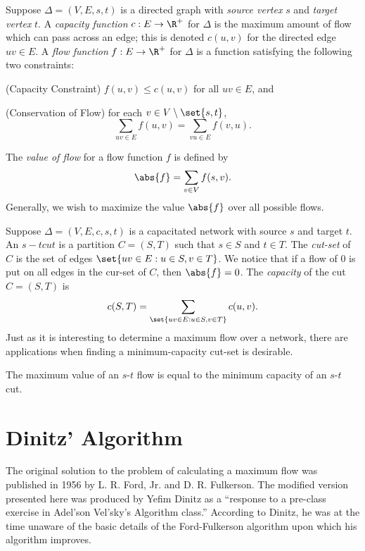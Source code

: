 \documentclass[m3380-lec-main.tex]{subfiles}
\begin{document}
\begin{defn} Suppose $\Delta = (V,E,s,t)$ is a directed graph with \emph{source vertex} $s$ and \emph{target vertex} $t$. A \emph{capacity function} $c:E\to\R^+$ for $\Delta$ is the maximum amount of flow which can pass across an edge; this is denoted $c(u,v)$ for the directed edge $uv\in E$. A \emph{flow function} $f:E\to \R^+$ for $\Delta$ is a function satisfying the following two constraints:
\begin{enum}
\item (Capacity Constraint) $f(u,v) \leq c(u,v)$ for all $uv\in E$, and
\item (Conservation of Flow) for each $v\in V\setminus\set{s,t}$, \[\sum_{uv\in E}f(u,v) = \sum_{vu\in E}f(v,u).\]
\end{enum}
The \emph{value of flow} for a flow function $f$ is defined by 
\[ \abs{f} = \sum_{v\in V}f(s,v) .\]
Generally, we wish to maximize the value $\abs{f}$ over all possible flows.
\end{defn}

\begin{defn} Suppose $\Delta = (V,E,c,s,t)$ is a capacitated network with source $s$ and target $t$. An $s-t cut$ is a partition $C=(S,T)$ such that $s\in S$ and $t\in T$. The \emph{cut-set} of $C$ is the set of edges $\set{uv\in E:u\in S, v\in T}$. We notice that if a flow of $0$ is put on all edges in the cur-set of $C$, then $\abs{f}=0$. The \emph{capacity} of the cut $C=(S,T)$ is 
\[c(S,T) = \sum_{\set{uv\in E: u\in S, v\in T}}c(u,v). \]
Just as it is interesting to determine a maximum flow over a network, there are applications when finding a minimum-capacity cut-set is desirable.
\end{defn}

\begin{thm} The maximum value of an $s$-$t$ flow is equal to the minimum capacity of an $s$-$t$ cut.
\end{thm}

\section{Dinitz' Algorithm}
The original solution to the problem of calculating a maximum flow was published in 1956 by {L. R. Ford, Jr. and D. R. Fulkerson}. The modified version presented here was produced by Yefim Dinitz as a ``response to a pre-class exercise in Adel'son Vel'sky's Algorithm class.'' According to Dinitz, he was at the time unaware of the basic details of the Ford-Fulkerson algorithm upon which his algorithm improves.
\end{document}
